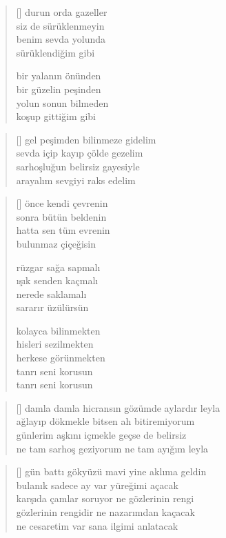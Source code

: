 \documentclass[a5paper, openright, twoside]{memoir}
\begin{document}
\begin{verse}[\versewidth]
  durun orda gazeller \\
  siz de sürüklenmeyin \\
  benim sevda yolunda \\
  sürüklendiğim gibi

  bir yalanın önünden \\
  bir güzelin peşinden \\
  yolun sonun bilmeden \\
  koşup gittiğim gibi
\end{verse}
\begin{verse}[\versewidth]
  gel peşimden bilinmeze gidelim \\
  sevda içip kayıp çölde gezelim \\
  sarhoşluğun belirsiz gayesiyle \\
  arayalım sevgiyi raks edelim
\end{verse}
\begin{verse}[\versewidth]
  önce kendi çevrenin \\
  sonra bütün beldenin \\
  hatta sen tüm evrenin \\
  bulunmaz çiçeğisin

  rüzgar sağa sapmalı \\
  ışık senden kaçmalı \\
  nerede saklamalı \\
  sararır üzülürsün

  kolayca bilinmekten \\
  hisleri sezilmekten \\
  herkese görünmekten \\
  tanrı seni korusun \\
  tanrı seni korusun
\end{verse}
\begin{verse}[\versewidth]
  damla damla hicransın gözümde aylardır leyla \\
  ağlayıp dökmekle bitsen ah bitiremiyorum \\
  günlerim aşkını içmekle geçse de belirsiz \\
  ne tam sarhoş geziyorum ne tam ayığım leyla
\end{verse}
\begin{verse}[\versewidth]
  gün battı gökyüzü mavi yine aklıma geldin \\
  bulanık sadece ay var yüreğimi açacak \\
  karşıda çamlar soruyor ne gözlerinin rengi \\
  gözlerinin rengidir ne nazarımdan kaçacak \\
  ne cesaretim var sana ilgimi anlatacak
\end{verse}
\end{document}
